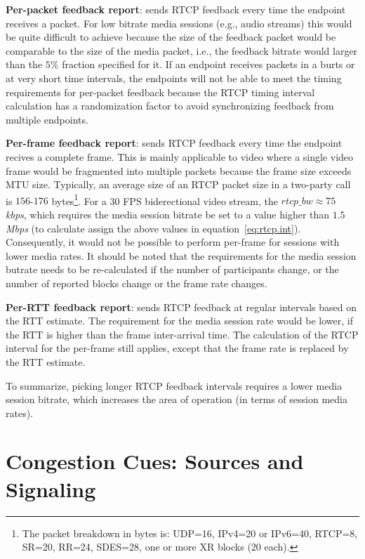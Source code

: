 \textbf{Per-packet feedback report}: sends RTCP feedback every time the
endpoint receives a packet. For low bitrate media sessions (e.g., audio
streams) this would be quite difficult to achieve because the size of the
feedback packet would be comparable to the size of the media packet, i.e., the
feedback bitrate would larger than the $5\%$ fraction specified for it. If an
endpoint receives packets in a burts or at very short time intervals, the
endpoints will not be able to meet the timing requirements for per-packet
feedback because the RTCP timing interval calculation has a randomization
factor to avoid synchronizing feedback from multiple endpoints.

\textbf{Per-frame feedback report}: sends RTCP feedback every time the
endpoint recives a complete frame. This is mainly applicable to video where a
single video frame would be fragmented into multiple packets because the frame
size exceeds MTU size. Typically, an average size of an RTCP packet size in a
two-party call is $156$-$176$ bytes\footnote{The packet breakdown in bytes is:
UDP=16, IPv4=20 or IPv6=40, RTCP=8, SR=20, RR=24, SDES=28, one or more XR
blocks (20 each).}. For a 30 FPS biderectional video stream, the $rtcp\_bw
\approx 75$ \emph{kbps}, which requires the media session bitrate be set to a
value higher than $1.5$ \emph{Mbps} (to calculate assign the above values in
equation~\ref{eq:rtcp.int}). Consequently, it would not be possible to perform
per-frame for sessions with lower media rates. It should be noted that the
requirements for the media session butrate needs to be re-calculated if the
number of participants change, or the number of reported blocks change or the
frame rate changes.

\textbf{Per-RTT feedback report}: sends RTCP feedback at regular intervals
based on the RTT estimate. The requirement for the media session rate would be
lower, if the RTT is higher than the frame inter-arrival time. The calculation
of the RTCP interval for the per-frame still applies, except that the frame
rate is replaced by the RTT estimate.

To summarize, picking longer RTCP feedback intervals requires a lower media
session bitrate, which increases the area of operation (in terms of session
media rates).

\section{Congestion Cues: Sources and Signaling}
\label{fw.fw}

